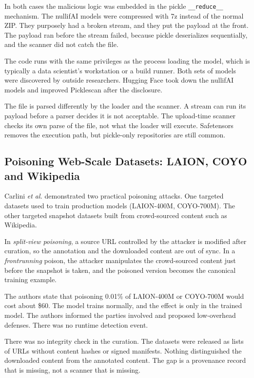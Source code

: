 \documentclass[conference]{IEEEtran}
\begin{document}
In both cases the malicious logic was embedded in the pickle \texttt{\_\_reduce\_\_} mechanism. The nullifAI models were compressed with 7z instead of the normal ZIP. They purposely had a broken stream, and they put the payload at the front. The payload ran before the stream failed, because pickle deserializes sequentially, and the scanner did not catch the file.

The code runs with the same privileges as the process loading the model, which is typically a data scientist's workstation or a build runner. Both sets of models were discovered by outside researchers. Hugging Face took down the nullifAI models and improved Picklescan after the disclosure.

The file is parsed differently by the loader and the scanner. A stream can run its payload before a parser decides it is not acceptable. The upload-time scanner checks its own parse of the file, not what the loader will execute. Safetensors removes the execution path, but pickle-only repositories are still common.

\subsection{Poisoning Web-Scale Datasets: LAION, COYO and Wikipedia}
\label{sec:case-datasets}

Carlini \textit{et al.} demonstrated two practical poisoning attacks. One targeted datasets used to train production models (LAION-400M, COYO-700M). The other targeted snapshot datasets built from crowd-sourced content such as Wikipedia.

In \emph{split-view poisoning}, a source URL controlled by the attacker is modified after curation, so the annotation and the downloaded content are out of sync. In a \emph{frontrunning} poison, the attacker manipulates the crowd-sourced content just before the snapshot is taken, and the poisoned version becomes the canonical training example.

The authors state that poisoning 0.01\% of LAION-400M or COYO-700M would cost about \$60. The model trains normally, and the effect is only in the trained model. The authors informed the parties involved and proposed low-overhead defenses. There was no runtime detection event.

There was no integrity check in the curation. The datasets were released as lists of URLs without content hashes or signed manifests. Nothing distinguished the downloaded content from the annotated content. The gap is a provenance record that is missing, not a scanner that is missing.
\end{document}
